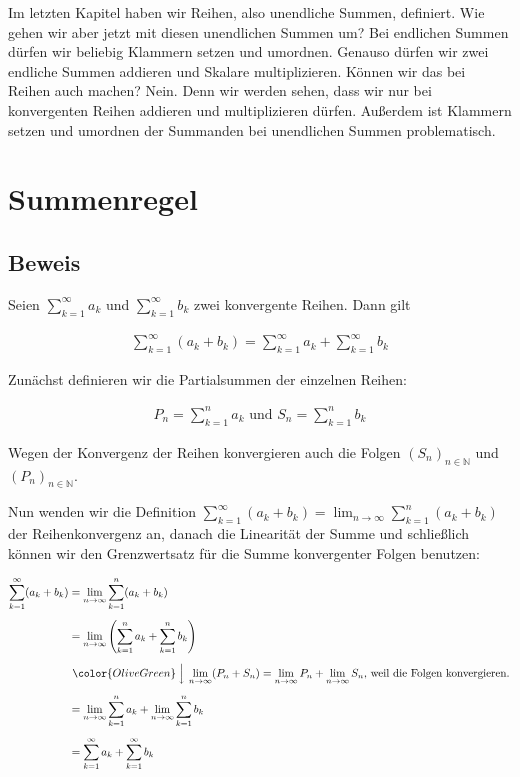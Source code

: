 \documentclass[fontsize=9pt,
               parskip=half-,
               DIV=14,
               listof=chapterentry,
               tocflat]{scrbook}
\begin{document}
Im letzten Kapitel haben wir Reihen, also unendliche Summen, definiert. Wie gehen wir aber jetzt mit diesen unendlichen Summen um? Bei endlichen Summen dürfen wir beliebig Klammern setzen und umordnen. Genauso dürfen wir zwei endliche Summen addieren und Skalare multiplizieren. Können wir das bei Reihen auch machen? Nein. Denn wir werden sehen, dass wir nur bei konvergenten Reihen addieren und multiplizieren dürfen. Außerdem ist Klammern setzen und umordnen der Summanden bei unendlichen Summen problematisch.

\section{Summenregel}

\subsection{Beweis}

\begin{theorem*}
Seien $\sum _{k=1}^{\infty }a_{k}$ und $\sum _{k=1}^{\infty }b_{k}$ zwei konvergente Reihen. Dann gilt

\begin{align*}
\sum _{k=1}^{\infty }(a_{k}+b_{k})=\sum _{k=1}^{\infty }a_{k}+\sum _{k=1}^{\infty }b_{k}
\end{align*}

\end{theorem*}

\begin{proof*}
Zunächst definieren wir die Partialsummen der einzelnen Reihen:

\begin{align*}
P_{n}=\sum _{k=1}^{n}a_{k}{\text{ und }}S_{n}=\sum _{k=1}^{n}b_{k}
\end{align*}

Wegen der Konvergenz der Reihen konvergieren auch die Folgen $(S_{n})_{n\in \mathbb {N} }$ und $(P_{n})_{n\in \mathbb {N} }$.

Nun wenden wir die Definition $\sum _{k=1}^{\infty }(a_{k}+b_{k})=\lim _{n\to \infty }\sum _{k=1}^{n}(a_{k}+b_{k})$ der Reihenkonvergenz an, danach die Linearität der Summe und schließlich können wir den Grenzwertsatz für die Summe konvergenter Folgen benutzen:

\begin{align*}
\sum _{k=1}^{\infty }(a_{k}+b_{k})&=\lim _{n\to \infty }\sum _{k=1}^{n}(a_{k}+b_{k})\\[0.5em]&=\lim _{n\to \infty }\left(\sum _{k=1}^{n}a_{k}+\sum _{k=1}^{n}b_{k}\right)\\[0.5em]&\ {\color {OliveGreen}\left\downarrow \ \lim _{n\to \infty }(P_{n}+S_{n})=\lim _{n\to \infty }P_{n}+\lim _{n\to \infty }S_{n}{\text{, weil die Folgen konvergieren.}}\right.}\\[0.5em]&=\lim _{n\to \infty }\sum _{k=1}^{n}a_{k}+\lim _{n\to \infty }\sum _{k=1}^{n}b_{k}\\[0.5em]&=\sum _{k=1}^{\infty }a_{k}+\sum _{k=1}^{\infty }b_{k}
\end{align*}

\end{proof*}
\end{document}
